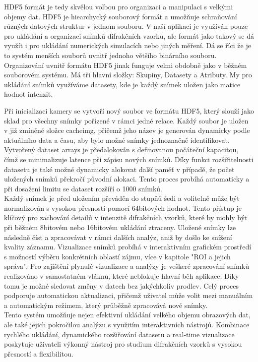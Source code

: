 \documentclass{article}
\begin{document}
HDF5 formát je tedy skvělou volbou pro organizaci a manipulaci s velkými objemy dat. HDF5 je hiearchycký souborový formát a umožňuje schraňování různých datových struktur v jednom souboru. V naší aplikaci je využíván pouze pro ukládání a organizaci snímků difrakčních vzorků, ale formát jako takový se dá využít i pro ukládání numerických simulacích nebo jiných měření. Dá se říci že je to systém menších souborů uvnitř jednoho většího binárního souboru. Organizování uvnitř formátu HDF5 jinak funguje velmi obdobně jako v běžném souborovém systému. Má tři hlavní složky: Skupiny, Datasety a Atributy. My pro ukládání snímků využíváme datasety, kde je každý snímek uložen jako matice hodnot intenzit.

Při inicializaci kamery se vytvoří nový soubor ve formátu HDF5, který slouží jako sklad pro všechny snímky pořízené v rámci jedné relace. Každý soubor je uložen v již zmíněné složce cacheimg, přičemž jeho název je generován dynamicky podle aktuálního data a času, aby bylo možné snímky jednoznačně identifikovat. Vytvořený dataset arrays je předalokován s definovanou počáteční kapacitou, čímž se minimalizuje latence při zápisu nových snímků. Díky funkci rozšiřitelnosti datasetu je také možné dynamicky alokovat další paměť v případě, že počet uložených snímků překročí původní alokaci. Tento proces probíhá automaticky a při dosažení limitu se dataset rozšíří o 1000 snímků.\\

Každý snímek je před uložením převáděn do stupňů šedi a volitelně může být normalizován s vysokou přesností pomocí 64bitových hodnot. Tento přístup je klíčový pro zachování detailů v intenzitě difrakčních vzorků, které by mohly být při běžném 8bitovém nebo 16bitovém ukládání ztraceny. Uložené snímky lze následně číst a zpracovávat v rámci dalších analýz, aniž by došlo ke snížení kvality záznamu. Vizualizace snímků probíhá v interaktivním grafickém prostředí s možností výběru konkrétních oblastí zájmu, více v kapitole "ROI a jejich správa". Pro zajištění plynulé vizualizace a analýzy je veškeré zpracování snímků realizováno v samostatném vláknu, které neblokuje hlavní běh aplikace. Díky tomu je možné sledovat změny v datech bez jakýchkoliv prodlev. Celý proces podporuje automatickou aktualizaci, přičemž uživatel může volit mezi manuálním a automatickým režimem, který průběžně zpracovává nové snímky.\\

Tento systém umožňuje nejen efektivní ukládání velkého objemu obrazových dat, ale také jejich pokročilou analýzu s využitím interaktivních nástrojů. Kombinace rychlého ukládání, dynamického rozšiřování datasetu a real-time vizualizace poskytuje uživateli výkonný nástroj pro studium difrakčních vzorků s vysokou přesností a flexibilitou.\\
\end{document}
